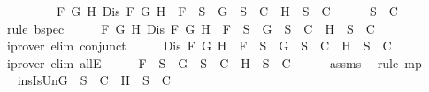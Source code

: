\begin{isabellebody}
\ \ \ \ \ \ \ \ {\isasymand}\ {\isacharparenleft}{\isasymforall}F\ G\ H{\isachardot}\ Dis\ F\ G\ H\ {\isasymlongrightarrow}\ F\ {\isasymin}\ {\isacharquery}S\ {\isasymlongrightarrow}\ {\isacharbraceleft}G{\isacharbraceright}\ {\isasymunion}\ {\isacharquery}S\ {\isasymin}\ C\ {\isasymor}\ {\isacharbraceleft}H{\isacharbraceright}\ {\isasymunion}\ {\isacharquery}S\ {\isasymin}\ C{\isacharparenright}{\isachardoublequoteclose}\isanewline
\ \ \ \ \isamarkupfalse%
\ {\isacartoucheopen}{\isacharquery}S\ {\isasymin}\ C{\isacartoucheclose}\ \isamarkupfalse%
\ {\isacharparenleft}rule\ bspec{\isacharparenright}\isanewline
\ \ \isamarkupfalse%
\ \isamarkupfalse%
\ {\isachardoublequoteopen}{\isasymforall}F\ G\ H{\isachardot}\ Dis\ F\ G\ H\ {\isasymlongrightarrow}\ F\ {\isasymin}\ {\isacharquery}S\ {\isasymlongrightarrow}\ {\isacharbraceleft}G{\isacharbraceright}\ {\isasymunion}\ {\isacharquery}S\ {\isasymin}\ C\ {\isasymor}\ {\isacharbraceleft}H{\isacharbraceright}\ {\isasymunion}\ {\isacharquery}S\ {\isasymin}\ C{\isachardoublequoteclose}\isanewline
\ \ \ \ \isamarkupfalse%
\ {\isacharparenleft}iprover\ elim{\isacharcolon}\ conjunct{}{\isacharparenright}\isanewline
\ \ \isamarkupfalse%
\ \isamarkupfalse%
\ {\isachardoublequoteopen}Dis\ F\ G\ H\ {\isasymlongrightarrow}\ F\ {\isasymin}\ {\isacharquery}S\ {\isasymlongrightarrow}\ {\isacharbraceleft}G{\isacharbraceright}\ {\isasymunion}\ {\isacharquery}S\ {\isasymin}\ C\ {\isasymor}\ {\isacharbraceleft}H{\isacharbraceright}\ {\isasymunion}\ {\isacharquery}S\ {\isasymin}\ C{\isachardoublequoteclose}\isanewline
\ \ \ \ \isamarkupfalse%
\ {\isacharparenleft}iprover\ elim{\isacharcolon}\ allE{\isacharparenright}\isanewline
\ \ \isamarkupfalse%
\ \isamarkupfalse%
\ {\isachardoublequoteopen}F\ {\isasymin}\ {\isacharquery}S\ {\isasymlongrightarrow}\ {\isacharbraceleft}G{\isacharbraceright}\ {\isasymunion}\ {\isacharquery}S\ {\isasymin}\ C\ {\isasymor}\ {\isacharbraceleft}H{\isacharbraceright}\ {\isasymunion}\ {\isacharquery}S\ {\isasymin}\ C{\isachardoublequoteclose}\isanewline
\ \ \ \ \isamarkupfalse%
\ assms{\isacharparenleft}{}{\isacharparenright}\ \isamarkupfalse%
\ {\isacharparenleft}rule\ mp{\isacharparenright}\isanewline
\ \ \isamarkupfalse%
\ \isamarkupfalse%
\ insIsUn{\isacharcolon}{\isachardoublequoteopen}{\isacharbraceleft}G{\isacharbraceright}\ {\isasymunion}\ {\isacharquery}S\ {\isasymin}\ C\ {\isasymor}\ {\isacharbraceleft}H{\isacharbraceright}\ {\isasymunion}\ {\isacharquery}S\ {\isasymin}\ C{\isachardoublequoteclose}\isanewline

\end{isabellebody}
